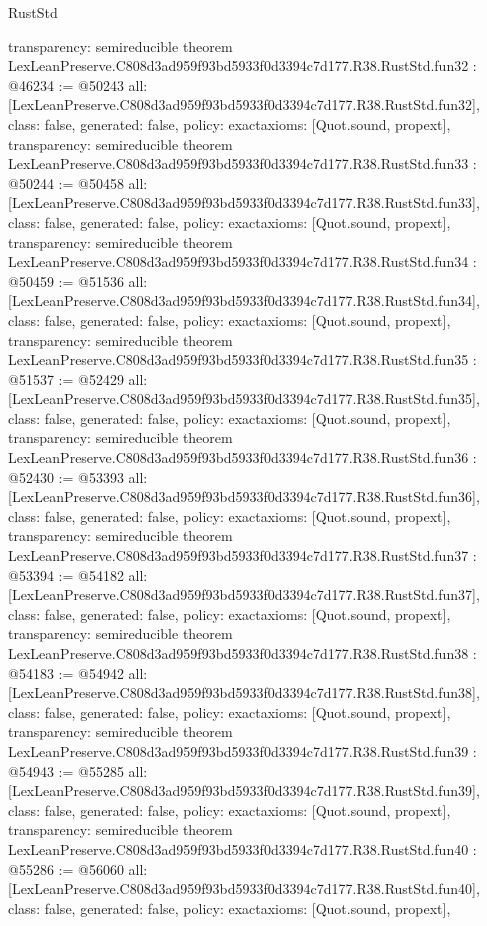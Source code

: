 \begin{lexlean}{RustStd}
\begin{coremodule}
{  transparency: semireducible
}
theorem LexLeanPreserve.C808d3ad959f93bd5933f0d3394c7d177.R38.RustStd.fun32 : @46234 := @50243 {
  all: [LexLeanPreserve.C808d3ad959f93bd5933f0d3394c7d177.R38.RustStd.fun32],
  class: false,
  generated: false,
  policy: exact{axioms: [Quot.sound, propext]},
  transparency: semireducible
}
theorem LexLeanPreserve.C808d3ad959f93bd5933f0d3394c7d177.R38.RustStd.fun33 : @50244 := @50458 {
  all: [LexLeanPreserve.C808d3ad959f93bd5933f0d3394c7d177.R38.RustStd.fun33],
  class: false,
  generated: false,
  policy: exact{axioms: [Quot.sound, propext]},
  transparency: semireducible
}
theorem LexLeanPreserve.C808d3ad959f93bd5933f0d3394c7d177.R38.RustStd.fun34 : @50459 := @51536 {
  all: [LexLeanPreserve.C808d3ad959f93bd5933f0d3394c7d177.R38.RustStd.fun34],
  class: false,
  generated: false,
  policy: exact{axioms: [Quot.sound, propext]},
  transparency: semireducible
}
theorem LexLeanPreserve.C808d3ad959f93bd5933f0d3394c7d177.R38.RustStd.fun35 : @51537 := @52429 {
  all: [LexLeanPreserve.C808d3ad959f93bd5933f0d3394c7d177.R38.RustStd.fun35],
  class: false,
  generated: false,
  policy: exact{axioms: [Quot.sound, propext]},
  transparency: semireducible
}
theorem LexLeanPreserve.C808d3ad959f93bd5933f0d3394c7d177.R38.RustStd.fun36 : @52430 := @53393 {
  all: [LexLeanPreserve.C808d3ad959f93bd5933f0d3394c7d177.R38.RustStd.fun36],
  class: false,
  generated: false,
  policy: exact{axioms: [Quot.sound, propext]},
  transparency: semireducible
}
theorem LexLeanPreserve.C808d3ad959f93bd5933f0d3394c7d177.R38.RustStd.fun37 : @53394 := @54182 {
  all: [LexLeanPreserve.C808d3ad959f93bd5933f0d3394c7d177.R38.RustStd.fun37],
  class: false,
  generated: false,
  policy: exact{axioms: [Quot.sound, propext]},
  transparency: semireducible
}
theorem LexLeanPreserve.C808d3ad959f93bd5933f0d3394c7d177.R38.RustStd.fun38 : @54183 := @54942 {
  all: [LexLeanPreserve.C808d3ad959f93bd5933f0d3394c7d177.R38.RustStd.fun38],
  class: false,
  generated: false,
  policy: exact{axioms: [Quot.sound, propext]},
  transparency: semireducible
}
theorem LexLeanPreserve.C808d3ad959f93bd5933f0d3394c7d177.R38.RustStd.fun39 : @54943 := @55285 {
  all: [LexLeanPreserve.C808d3ad959f93bd5933f0d3394c7d177.R38.RustStd.fun39],
  class: false,
  generated: false,
  policy: exact{axioms: [Quot.sound, propext]},
  transparency: semireducible
}
theorem LexLeanPreserve.C808d3ad959f93bd5933f0d3394c7d177.R38.RustStd.fun40 : @55286 := @56060 {
  all: [LexLeanPreserve.C808d3ad959f93bd5933f0d3394c7d177.R38.RustStd.fun40],
  class: false,
  generated: false,
  policy: exact{axioms: [Quot.sound, propext]},
}
\end{coremodule}
\end{lexlean}

